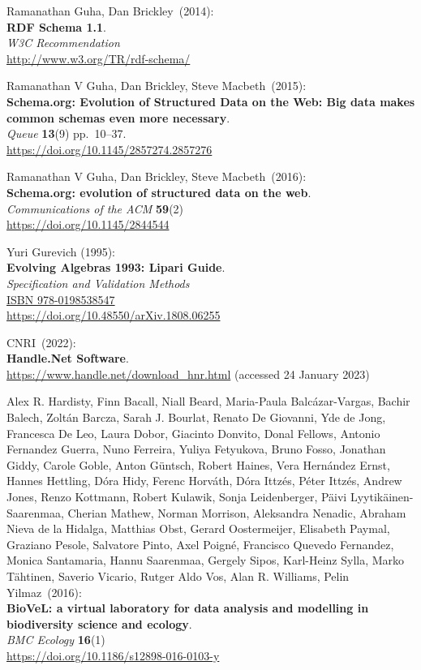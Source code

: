 \begin{thebibliography}{9}
Ramanathan Guha, Dan Brickley~(2014): \\
\textbf{RDF Schema 1.1}.\\
\emph{W3C Recommendation} \\
\url{http://www.w3.org/TR/rdf-schema/}

Ramanathan V Guha, Dan Brickley, Steve Macbeth~(2015): \\
\textbf{Schema.org: Evolution of Structured Data on the Web: Big data makes common schemas even more necessary}.\\
\emph{Queue} \textbf{13}(9) pp.~10--37.\\
\url{https://doi.org/10.1145/2857274.2857276}

Ramanathan V Guha, Dan Brickley, Steve Macbeth~(2016): \\
\textbf{Schema.org: evolution of structured data on the web}.\\
\emph{Communications of the ACM} \textbf{59}(2)\\
\url{https://doi.org/10.1145/2844544}

Yuri Gurevich (1995):\\
\textbf{Evolving Algebras 1993: Lipari Guide}.\\
\emph{Specification and Validation Methods} \\
\href{https://identifiers.org/isbn/9780198538547}{ISBN 978-0198538547} \\
\url{https://doi.org/10.48550/arXiv.1808.06255}

CNRI~(2022): \\
\textbf{Handle.Net Software}. \\
\url{https://www.handle.net/download_hnr.html} (accessed 24 January 2023)

Alex R. Hardisty, Finn Bacall, Niall Beard, Maria-Paula Balcázar-Vargas, Bachir Balech, Zoltán Barcza, Sarah J. Bourlat, Renato De Giovanni, Yde de Jong, Francesca De Leo, Laura Dobor, Giacinto Donvito, Donal Fellows, Antonio Fernandez Guerra, Nuno Ferreira, Yuliya Fetyukova, Bruno Fosso, Jonathan Giddy, Carole Goble, Anton Güntsch, Robert Haines, Vera Hernández Ernst, Hannes Hettling, Dóra Hidy, Ferenc Horváth, Dóra Ittzés, Péter Ittzés, Andrew Jones, Renzo Kottmann, Robert Kulawik, Sonja Leidenberger, Päivi Lyytikäinen-Saarenmaa, Cherian Mathew, Norman Morrison, Aleksandra Nenadic, Abraham Nieva de la Hidalga, Matthias Obst, Gerard Oostermeijer, Elisabeth Paymal, Graziano Pesole, Salvatore Pinto, Axel Poigné, Francisco Quevedo Fernandez, Monica Santamaria, Hannu Saarenmaa, Gergely Sipos, Karl-Heinz Sylla, Marko Tähtinen, Saverio Vicario, Rutger Aldo Vos, Alan R. Williams, Pelin Yilmaz~(2016): \\
\textbf{BioVeL: a virtual laboratory for data analysis and modelling in biodiversity science and ecology}.\\
\emph{BMC Ecology} \textbf{16}(1)\\
\url{https://doi.org/10.1186/s12898-016-0103-y}


\end{thebibliography}
